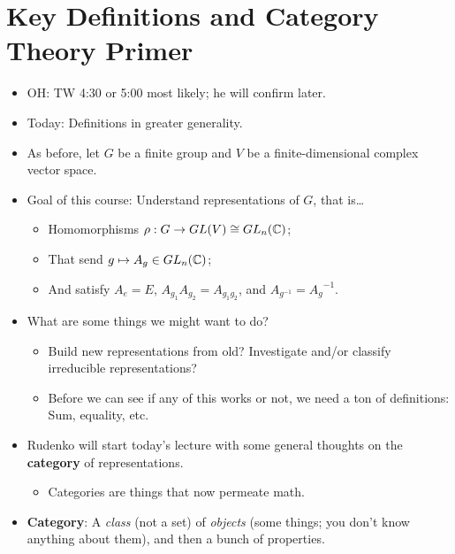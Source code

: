\documentclass[../notes.tex]{subfiles}
\begin{document}
\section{Key Definitions and Category Theory Primer}
\begin{itemize}
    \item {}OH: TW 4:30 or 5:00 most likely; he will confirm later.
    \item Today: Definitions in greater generality.
    \item As before, let $G$ be a finite group and $V$ be a finite-dimensional complex vector space.
    \item Goal of this course: Understand representations of $G$, that is\dots
    \begin{itemize}
        \item Homomorphisms $\rho:G\to GL(V)\cong GL_n(\mathbb{C})$;
        \item That send $g\mapsto A_g\in GL_n(\mathbb{C})$;
        \item And satisfy $A_e=E$, $A_{g_1}A_{g_2}=A_{g_1g_2}$, and $A_{g^{-1}}={A_g}^{-1}$.
    \end{itemize}
    \item What are some things we might want to do?
    \begin{itemize}
        \item Build new representations from old? Investigate and/or classify irreducible representations?
        \item Before we can see if any of this works or not, we need a ton of definitions: Sum, equality, etc.
    \end{itemize}
    \item Rudenko will start today's lecture with some general thoughts on the \textbf{category} of representations.
    \begin{itemize}
        \item Categories are things that now permeate math.
    \end{itemize}
    \item \textbf{Category}: A \emph{class} (not a set) of \emph{objects} (some things; you don't know anything about them), and then a bunch of properties.
    \begin{figure}[h!]
        \centering
\end{figure}
\end{itemize}
\end{document}
